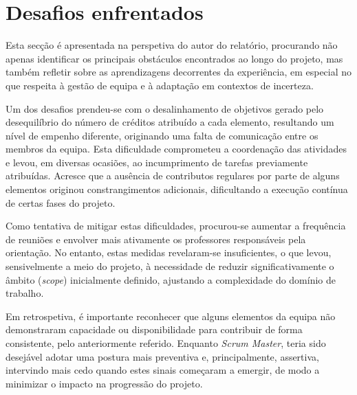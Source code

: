 

\section{Desafios enfrentados}

Esta secção é apresentada na perspetiva do autor do relatório, procurando não apenas identificar os principais obstáculos encontrados ao longo do projeto, mas também refletir sobre as aprendizagens decorrentes da experiência, em especial no que respeita à gestão de equipa e à adaptação em contextos de incerteza.

Um dos desafios prendeu-se com o desalinhamento de objetivos gerado pelo desequilíbrio do número de créditos atribuído a cada elemento, resultando um nível de empenho diferente, originando uma falta de comunicação entre os membros da equipa. Esta dificuldade comprometeu a coordenação das atividades e levou, em diversas ocasiões, ao incumprimento de tarefas previamente atribuídas. Acresce que a ausência de contributos regulares por parte de alguns elementos originou constrangimentos adicionais, dificultando a execução contínua de certas fases do projeto.

Como tentativa de mitigar estas dificuldades, procurou-se aumentar a frequência de reuniões e envolver mais ativamente os professores responsáveis pela orientação. No entanto, estas medidas revelaram-se insuficientes, o que levou, sensivelmente a meio do projeto, à necessidade de reduzir significativamente o âmbito (\textit{scope}) inicialmente definido, ajustando a complexidade do domínio de trabalho.

Em retrospetiva, é importante reconhecer que alguns elementos da equipa não demonstraram capacidade ou disponibilidade para contribuir de forma consistente, pelo anteriormente referido. Enquanto \textit{Scrum Master}, teria sido desejável adotar uma postura mais preventiva e, principalmente, assertiva, intervindo mais cedo quando estes sinais começaram a emergir, de modo a minimizar o impacto na progressão do projeto.